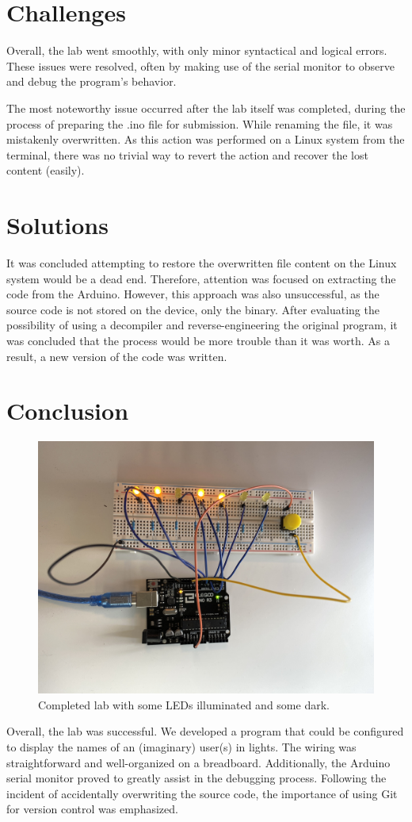 \documentclass[fleqn]{article}
\begin{document}
\section{Challenges}
Overall, the lab went smoothly, with only minor syntactical and logical errors. These issues were resolved, often by making use of the serial monitor to observe and debug the program's behavior.

The most noteworthy issue occurred after the lab itself was completed, during the process of preparing the .ino file for submission. While renaming the file, it was mistakenly overwritten. As this action was performed on a Linux system from the terminal, there was no trivial way to revert the action and recover the lost content (easily). 
\section{Solutions}

It was concluded attempting to restore the overwritten file content on the Linux system would be a dead end. Therefore, attention was focused on extracting the code from the Arduino. However, this approach was also unsuccessful, as the source code is not stored on the device, only the binary. After evaluating the possibility of using a decompiler and reverse-engineering the original program, it was concluded that the process would be more trouble than it was worth. As a result, a new version of the code was written.
\section{Conclusion}
    \begin{figure}[H]
        \centering
        \includegraphics[width=6in]{image.jpg}
        \caption{Completed lab with some LEDs illuminated and some dark.}
    \end{figure}
    Overall, the lab was successful. We developed a program that could be configured to display the names of an (imaginary) user(s) in lights. The wiring was straightforward and well-organized on a breadboard. Additionally, the Arduino serial monitor proved to greatly assist in the debugging process. Following the incident of accidentally overwriting the source code, the importance of using Git for version control was emphasized.
\end{document}
